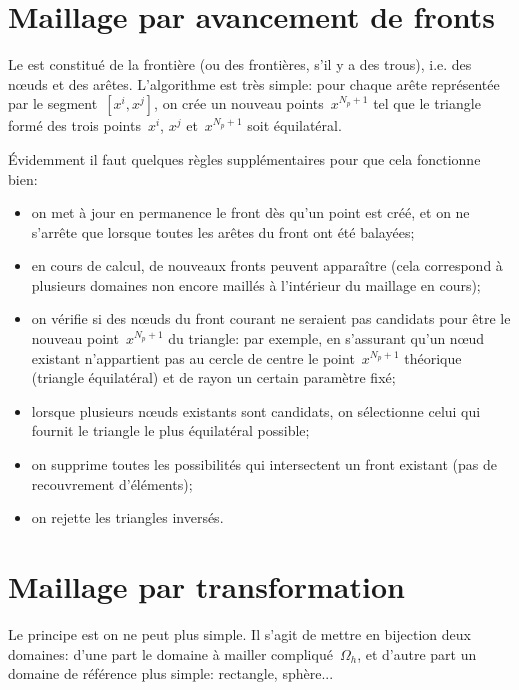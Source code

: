 \medskip
\section{Maillage par avancement de fronts}\label{Sec-MeshFront}

Le  est constitué de la frontière (ou des frontières, s'il y a des trous), i.e. des nœuds et des arêtes.
L'algorithme est très simple: pour chaque arête représentée par le segment~$[x^i,x^j]$, on crée un nouveau points~$x^{N_p+1}$ tel que le triangle formé des trois points~$x^i$, $x^j$ et~$x^{N_p+1}$ soit équilatéral.

\medskip
Évidemment il faut quelques règles supplémentaires pour que cela fonctionne bien:
\begin{itemize}
   \item on met à jour en permanence le front dès qu'un point est créé, et on ne s'arrête que lorsque toutes les arêtes du front ont été balayées;
   \item en cours de calcul, de nouveaux fronts peuvent apparaître (cela correspond à plusieurs domaines non encore maillés à l'intérieur du maillage en cours);
   \item on vérifie si des nœuds du front courant ne seraient pas candidats pour être le nouveau point~$x^{N_p+1}$ du triangle: par exemple, en s'assurant qu'un nœud existant n'appartient pas au cercle de centre le point~$x^{N_p+1}$ théorique (triangle équilatéral) et de rayon un certain paramètre fixé;
   \item lorsque plusieurs nœuds existants sont candidats, on sélectionne celui qui fournit le triangle le plus équilatéral possible;
   \item on supprime toutes les possibilités qui intersectent un front existant (pas de recouvrement d'éléments);
   \item on rejette les triangles inversés.
\end{itemize}


\medskip
\section{Maillage par transformation}\label{Sec-MeshTransfo}

Le principe est on ne peut plus simple. Il s'agit de mettre en bijection deux domaines: d'une part le domaine à mailler compliqué~$\Omega_h$, et d'autre part un domaine de référence plus simple: rectangle, sphère...

